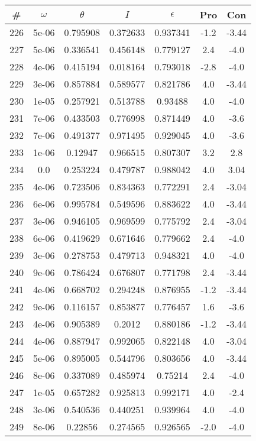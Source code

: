 \begin{table}
\begin{tabular}{c|c|c|c|c|c|c}
\# & $\omega$ & $\theta$ & $I$ & $\epsilon$ & Pro & Con\\
\hline
226 & 5e-06 & 0.795908 & 0.372633 & 0.937341 & -1.2 & -3.44\\
227 & 5e-06 & 0.336541 & 0.456148 & 0.779127 & 2.4 & -4.0\\
228 & 4e-06 & 0.415194 & 0.018164 & 0.793018 & -2.8 & -4.0\\
229 & 3e-06 & 0.857884 & 0.589577 & 0.821786 & 4.0 & -3.44\\
230 & 1e-05 & 0.257921 & 0.513788 & 0.93488 & 4.0 & -4.0\\
231 & 7e-06 & 0.433503 & 0.776998 & 0.871449 & 4.0 & -3.6\\
232 & 7e-06 & 0.491377 & 0.971495 & 0.929045 & 4.0 & -3.6\\
233 & 1e-06 & 0.12947 & 0.966515 & 0.807307 & 3.2 & 2.8\\
234 & 0.0 & 0.253224 & 0.479787 & 0.988042 & 4.0 & 3.04\\
235 & 4e-06 & 0.723506 & 0.834363 & 0.772291 & 2.4 & -3.04\\
236 & 6e-06 & 0.995784 & 0.549596 & 0.883622 & 4.0 & -3.44\\
237 & 3e-06 & 0.946105 & 0.969599 & 0.775792 & 2.4 & -3.04\\
238 & 6e-06 & 0.419629 & 0.671646 & 0.779662 & 2.4 & -4.0\\
239 & 3e-06 & 0.278753 & 0.479713 & 0.948321 & 4.0 & -4.0\\
240 & 9e-06 & 0.786424 & 0.676807 & 0.771798 & 2.4 & -3.44\\
241 & 4e-06 & 0.668702 & 0.294248 & 0.876955 & -1.2 & -3.44\\
242 & 9e-06 & 0.116157 & 0.853877 & 0.776457 & 1.6 & -3.6\\
243 & 4e-06 & 0.905389 & 0.2012 & 0.880186 & -1.2 & -3.44\\
244 & 4e-06 & 0.887947 & 0.992065 & 0.822148 & 4.0 & -3.04\\
245 & 5e-06 & 0.895005 & 0.544796 & 0.803656 & 4.0 & -3.44\\
246 & 8e-06 & 0.337089 & 0.485974 & 0.75214 & 2.4 & -4.0\\
247 & 1e-05 & 0.657282 & 0.925813 & 0.992171 & 4.0 & -2.4\\
248 & 3e-06 & 0.540536 & 0.440251 & 0.939964 & 4.0 & -4.0\\
249 & 8e-06 & 0.22856 & 0.274565 & 0.926565 & -2.0 & -4.0\\

\end{tabular}
\end{table}

